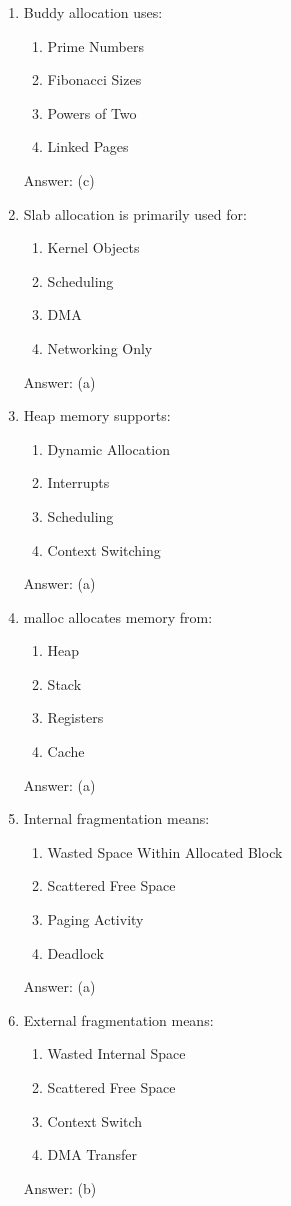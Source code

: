 \begin{enumerate}
\item Buddy allocation uses:
\begin{enumerate}[label=(\alph*)]
\item Prime Numbers
\item Fibonacci Sizes
\item Powers of Two
\item Linked Pages
\end{enumerate}
Answer: (c)

\item Slab allocation is primarily used for:
\begin{enumerate}[label=(\alph*)]
\item Kernel Objects
\item Scheduling
\item DMA
\item Networking Only
\end{enumerate}
Answer: (a)

\item Heap memory supports:
\begin{enumerate}[label=(\alph*)]
\item Dynamic Allocation
\item Interrupts
\item Scheduling
\item Context Switching
\end{enumerate}
Answer: (a)

\item malloc allocates memory from:
\begin{enumerate}[label=(\alph*)]
\item Heap
\item Stack
\item Registers
\item Cache
\end{enumerate}
Answer: (a)

\item Internal fragmentation means:
\begin{enumerate}[label=(\alph*)]
\item Wasted Space Within Allocated Block
\item Scattered Free Space
\item Paging Activity
\item Deadlock
\end{enumerate}
Answer: (a)

\item External fragmentation means:
\begin{enumerate}[label=(\alph*)]
\item Wasted Internal Space
\item Scattered Free Space
\item Context Switch
\item DMA Transfer
\end{enumerate}
Answer: (b)


\end{enumerate}
